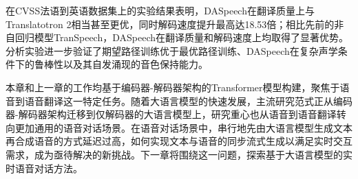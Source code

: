 在CVSS法语到英语数据集上的实验结果表明，DASpeech在翻译质量上与Translatotron 2相当甚至更优，同时解码速度提升最高达18.53倍；相比先前的非自回归模型TranSpeech，DASpeech在翻译质量和解码速度上均取得了显著优势。分析实验进一步验证了期望路径训练优于最优路径训练、DASpeech在复杂声学条件下的鲁棒性以及其自发涌现的音色保持能力。

本章和上一章的工作均基于编码器-解码器架构的Transformer模型构建，聚焦于语音到语音翻译这一特定任务。随着大语言模型的快速发展，主流研究范式正从编码器-解码器架构迁移到仅解码器的大语言模型上，研究重心也从语音到语音翻译转向更加通用的语音对话场景。在语音对话场景中，串行地先由大语言模型生成文本再合成语音的方式延迟过高，如何实现文本与语音的同步流式生成以满足实时交互需求，成为亟待解决的新挑战。下一章将围绕这一问题，探索基于大语言模型的实时语音对话方法。
